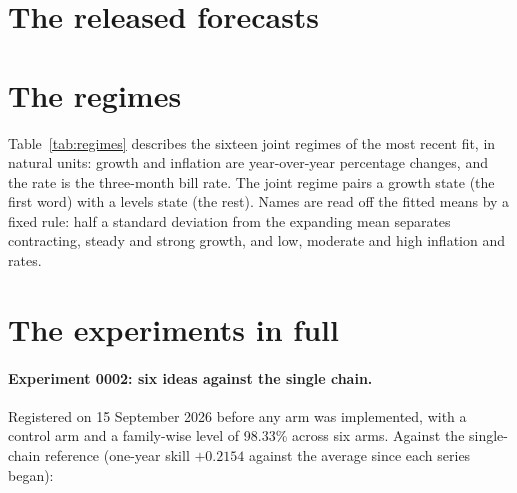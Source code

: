 \documentclass[11pt]{article}
\begin{document}
{\footnotesize
\setlength{\tabcolsep}{3pt}

}

\section{The released forecasts}\label{app:shipped}

\begin{table}[h]
\centering
\caption{Released forecasts, data as of 1 August 2026. The one-year probability is the blend, the
equal-weight average of the regime model half and the condition chain half shown beside it; the five-
and ten-year probabilities are the historical average R1.}
\label{tab:shipped}
\small

\end{table}

\section{The regimes}\label{app:regimes}

Table~\ref{tab:regimes} describes the sixteen joint regimes of the most recent fit, in natural units:
growth and inflation are year-over-year percentage changes, and the rate is the three-month bill rate.
The joint regime pairs a growth state (the first word) with a levels state (the rest). Names are read off
the fitted means by a fixed rule: half a standard deviation from the expanding mean separates
contracting, steady and strong growth, and low, moderate and high inflation and rates.

\begin{table}[h]
\centering
\caption{The sixteen joint regimes of the most recent fit. Growth and inflation are year-over-year
percentage changes and the bill rate is in percent; \emph{Share} is the percentage of months assigned to
the regime and \emph{Visit} its expected duration in months.}
\label{tab:regimes}
\footnotesize

\end{table}

\section{The experiments in full}\label{app:experiments}

\paragraph{Experiment 0002: six ideas against the single chain.} Registered on 15 September 2026 before
any arm was implemented, with a control arm and a family-wise level of 98.33\% across six arms. Against
the single-chain reference (one-year skill $+0.2154$ against the average since each series began):
\end{document}
